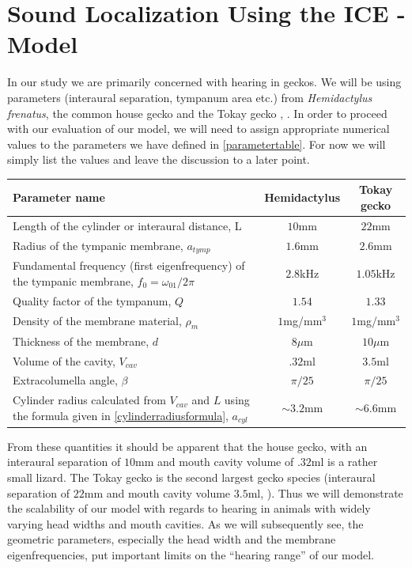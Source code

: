 \section{Sound Localization Using the ICE -Model}\label{localizationsection}
In our study we are primarily concerned with hearing in geckos. We will be using
parameters (interaural separation, tympanum area etc.) from \emph{Hemidactylus frenatus}, the common house gecko
\cite{dalsgaardmanley2} and the Tokay gecko \cite{dalsgaardmanley1}, \cite{dalsgaardtangcarr}. In order to proceed
with our evaluation of our model, we will need to assign appropriate numerical values to the parameters we have
defined in \ref{parametertable}. For now we will simply list the values and leave the discussion to a later point.

\vspace{\baselineskip}
\noindent
\begin{minipage}{\linewidth}
\renewcommand{\arraystretch}{1.3}
\centering
{}\label{geckogeometricparams}
\begin{tabular}{|p{8.5 cm} | c | c|}
\hline
Parameter name & Hemidactylus & Tokay gecko\\
\hline
Length of the cylinder or interaural distance, L & $10$mm & $22$mm\\
Radius of the tympanic membrane, $a_{tymp}$& $1.6$mm & $2.6$mm\\
Fundamental frequency (first eigenfrequency) of the tympanic membrane, $f_0=\omega_{01}/2\pi$ & $2.8$kHz & $1.05$kHz\\
Quality factor of the tympanum, $Q$ & $1.54$ &  $1.33$\\
Density of the membrane material, $\rho_m$ & $1$mg/mm$^3$ & $1$mg/mm$^3$\\
Thickness of the membrane, $d$& $8\mu$m & $10\mu$m\\
Volume of the cavity, $V_{cav}$ & $.32$ml & $3.5$ml\\ 
Extracolumella angle, $\beta$ & $\pi/25$ & $\pi/25$\\
Cylinder radius calculated from $V_{cav}$ and $L$ using the formula given in \eqref{cylinderradiusformula}, $a_{cyl}$ & $\sim 3.2$mm  &$\sim 6.6$mm \\
\hline
\end {tabular}\par
\bigskip
\end{minipage}
From these quantities it should be apparent that the house gecko, with an interaural separation of $10$mm and mouth cavity volume of $.32$ml is a rather
small lizard. The Tokay gecko is the second largest gecko species (interaural separation of $22$mm and mouth cavity volume $3.5$ml, \cite{dalsgaardmanley2}).
Thus we will demonstrate the scalability of our model with regards to hearing in animals with widely varying head widths and mouth cavities. As we will subsequently see, the geometric parameters, especially
the head width and the membrane eigenfrequencies, put important limits on the ``hearing range'' of our model.

